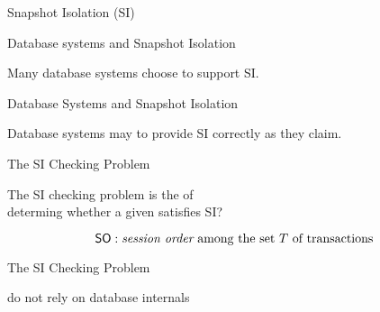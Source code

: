 \begin{frame}{Snapshot Isolation (SI)}
  \begin{center}
    \resizebox{0.60\textwidth}{!}{}
  \end{center}
\end{frame}

\begin{frame}{Database systems and Snapshot Isolation}
  \begin{center}
    Many database systems choose to support SI.

    \vspace{0.30cm}
  \end{center}
\end{frame}

\begin{frame}{Database Systems and Snapshot Isolation}
  \begin{center}
    Database systems may  to provide SI correctly as they claim.

    \vspace{0.30cm}
  \end{center}
\end{frame}

\begin{frame}{The SI Checking Problem}
  \begin{definition}
    The SI checking problem is the  of \\[5pt]
    determing whether a given  satisfies SI?
  \end{definition}


  \pause
  \vspace{-0.50cm}
  \[
    \textup{\textsf{SO}}: \text{{\it session order} among the set $T$ of transactions}
  \]
\end{frame}

\begin{frame}{The SI Checking Problem}
  \begin{center}
     do not rely on database internals

    \vspace{0.20cm}
    \resizebox{0.55\textwidth}{!}{}
    \vspace{0.20cm}

  \end{center}
\end{frame}

